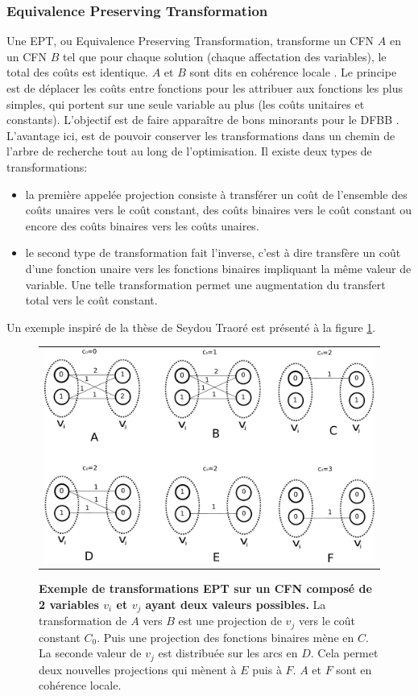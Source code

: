 \subsubsection{Equivalence Preserving Transformation}
Une EPT, ou \og Equivalence Preserving Transformation\fg, transforme un CFN $A$ en un CFN $B$ tel que pour chaque solution (chaque affectation des variables), le total des coûts  est identique. $A$ et $B$ sont dits \og en cohérence locale \fg. Le principe est de déplacer les coûts entre fonctions pour les attribuer aux fonctions les plus simples, qui portent sur une seule variable au plus (les coûts unitaires et constants). L'objectif est de faire apparaître de bons minorants pour le DFBB \cite{schiex00}. L'avantage ici, est de pouvoir conserver les transformations dans un chemin de l'arbre de recherche tout au long de l'optimisation. Il existe deux types de transformations:
\begin{itemize}
\item la première appelée projection consiste à transférer un coût de l'ensemble des coûts unaires vers le coût constant, des coûts binaires vers le coût constant ou encore des coûts binaires vers les coûts unaires.
\item le second type de transformation fait l'inverse, c'est à dire transfère un coût d'une fonction unaire vers les fonctions binaires impliquant la même valeur de variable. Une telle transformation permet une augmentation du transfert total vers le coût constant.
\end{itemize}
Un exemple inspiré de la thèse de Seydou Traoré est présenté à  la figure \ref{fig:EPT}.

\begin{figure}[!htbp]
  \centering
  \begin{tabular}{c}
    \includegraphics[width=14cm]{figure/coherences_local.pdf} \\
  \end{tabular}
  \caption{\textbf{Exemple de transformations EPT sur un CFN composé de 2 variables $v_i$ et $v_j$ ayant deux valeurs possibles.} La transformation de $A$ vers $B$ est une projection de $v_j$ vers le coût constant $C_0$. Puis une projection des fonctions binaires mène en $C$. La seconde valeur de $v_j$ est distribuée sur les arcs en $D$. Cela permet deux nouvelles projections qui mènent à $E$ puis à $F$. $A$ et $F$ sont en cohérence locale.}
  \label{fig:EPT}
\end{figure}

